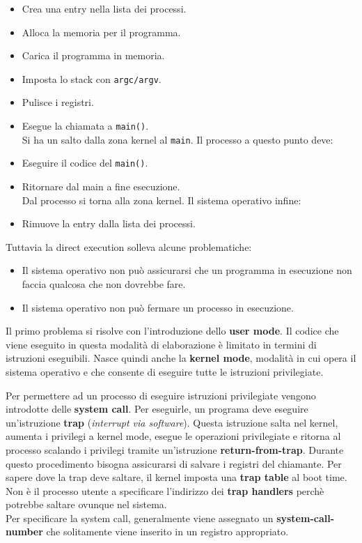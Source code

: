 \documentclass[12pt, letterpaper]{article}
\begin{document}
				\begin{itemize}
					\item Crea una entry nella lista dei processi.
					\item Alloca la memoria per il programma.
					\item Carica il programma in memoria.
					\item Imposta lo stack con \texttt{argc/argv}.
					\item Pulisce i registri.
					\item Esegue la chiamata a \texttt{main()}.\\
					Si ha un salto dalla zona kernel al \texttt{main}. Il processo a questo punto deve:
					\item Eseguire il codice del \texttt{main()}.
					\item Ritornare dal main a fine esecuzione.\\
					Dal processo si torna alla zona kernel. Il sistema operativo infine:
					\item Rimuove la entry dalla lista dei processi.
				\end{itemize}
				
				Tuttavia la direct execution solleva alcune problematiche:
				
				\begin{itemize}
					\item Il sistema operativo non può assicurarsi che un programma in esecuzione non faccia qualcosa che non dovrebbe fare.
					\item Il sistema operativo non può fermare un processo in esecuzione.
				\end{itemize}
				
				Il primo problema si risolve con l'introduzione dello \textbf{user mode}. Il codice che viene eseguito in questa modalità di elaborazione è limitato in termini di istruzioni eseguibili. Nasce quindi anche la \textbf{kernel mode}, modalità in cui opera il sistema operativo e che consente di eseguire tutte le istruzioni privilegiate.
				
				Per permettere ad un processo di eseguire istruzioni privilegiate vengono introdotte delle \textbf{system call}. Per eseguirle, un programa deve eseguire un'istruzione \textbf{trap} (\textit{interrupt via software}).	Questa istruzione salta nel kernel, aumenta i privilegi a kernel mode, esegue le operazioni privilegiate e ritorna al processo scalando i privilegi tramite un'istruzione \textbf{return-from-trap}. Durante questo procedimento bisogna assicurarsi di salvare i registri del chiamante. Per sapere dove la trap deve saltare, il kernel imposta una \textbf{trap table} al boot time. Non è il processo utente a specificare l'indirizzo dei \textbf{trap handlers} perchè potrebbe saltare ovunque nel sistema.\\
				Per specificare la system call, generalmente viene assegnato un \textbf{system-call-number} che solitamente viene inserito in un registro appropriato.
				
\end{document}
